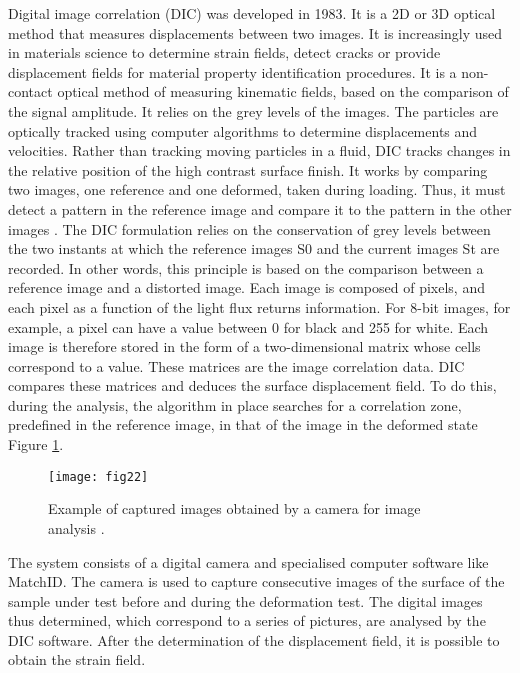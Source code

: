 Digital image correlation (DIC) was developed in 1983. It is a 2D or 3D optical method that measures displacements between two images. It is increasingly used in materials science to determine strain fields, detect cracks or provide displacement fields for material property identification procedures. It is a non-contact optical method of measuring kinematic fields, based on the comparison of the signal amplitude. It relies on the grey levels of the images. The particles are optically tracked using computer algorithms to determine displacements and velocities. Rather than tracking moving particles in a fluid, DIC tracks changes in the relative position of the high contrast surface finish. It works by comparing two images, one reference and one deformed, taken during loading. Thus, it must detect a pattern in the reference image and compare it to the pattern in the other images \citep{Mambili2018}. The DIC formulation relies on the conservation of grey levels between the two instants at which the reference images S0 and the current images St are recorded. In other words, this principle is based on the comparison between a reference image and a distorted image. Each image is composed of pixels, and each pixel as a function of the light flux returns information. For 8-bit images, for example, a pixel can have a value between 0 for black and 255 for white. Each image is therefore stored in the form of a two-dimensional matrix whose cells correspond to a value. These matrices are the image correlation data. DIC compares these matrices and deduces the surface displacement field. To do this, during the analysis, the algorithm in place searches for a correlation zone, predefined in the reference image, in that of the image in the deformed state Figure \ref{fig:fig22}.


\begin{figure}[htp]
	\centering
	\texttt{[image: fig22]}
	\caption{Example of captured images obtained by a camera for image analysis \citep{Mambili2018}.}
	\label{fig:fig22}
\end{figure}

The system consists of a digital camera and specialised computer software like MatchID. The camera is used to capture consecutive images of the surface of the sample under test before and during the deformation test. The digital images thus determined, which correspond to a series of pictures, are analysed by the DIC software. After the determination of
the displacement field, it is possible to
obtain the strain field.

